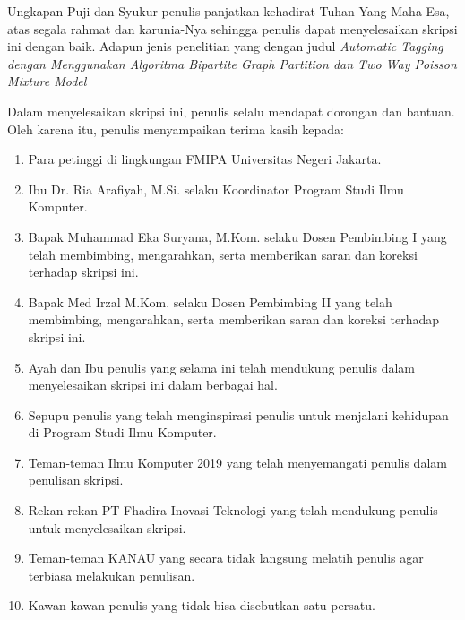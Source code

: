 \documentclass{jtetiskripsi}
\begin{document}
\cover





\preface

Ungkapan Puji dan Syukur penulis panjatkan kehadirat Tuhan Yang Maha Esa, atas segala rahmat dan karunia-Nya sehingga penulis dapat menyelesaikan skripsi ini dengan baik. Adapun jenis penelitian yang dengan judul \textit{Automatic Tagging dengan Menggunakan Algoritma Bipartite Graph Partition dan Two Way Poisson Mixture Model}

Dalam menyelesaikan skripsi ini, penulis selalu mendapat dorongan dan bantuan. Oleh karena itu, penulis menyampaikan terima kasih kepada:

\begin{enumerate}
  \item Para petinggi di lingkungan FMIPA Universitas Negeri Jakarta.
  \item Ibu Dr. Ria Arafiyah, M.Si. selaku Koordinator Program Studi Ilmu Komputer.
  \item Bapak Muhammad Eka Suryana, M.Kom. selaku Dosen Pembimbing I yang telah membimbing, mengarahkan, serta memberikan saran dan koreksi terhadap skripsi ini.
  \item Bapak Med Irzal M.Kom. selaku Dosen Pembimbing II yang telah membimbing, mengarahkan, serta memberikan saran dan koreksi terhadap skripsi ini.
  \item Ayah dan Ibu penulis yang selama ini telah mendukung penulis dalam menyelesaikan skripsi ini dalam berbagai hal.
  \item Sepupu penulis yang telah menginspirasi penulis untuk menjalani kehidupan di Program Studi Ilmu Komputer.
  \item Teman-teman Ilmu Komputer 2019 yang telah menyemangati penulis dalam penulisan skripsi.
  \item Rekan-rekan PT Fhadira Inovasi Teknologi yang telah mendukung penulis untuk menyelesaikan skripsi.
  \item Teman-teman KANAU yang secara tidak langsung melatih penulis agar terbiasa melakukan penulisan.
  \item Kawan-kawan penulis yang tidak bisa disebutkan satu persatu.
\end{enumerate}
\end{document}
